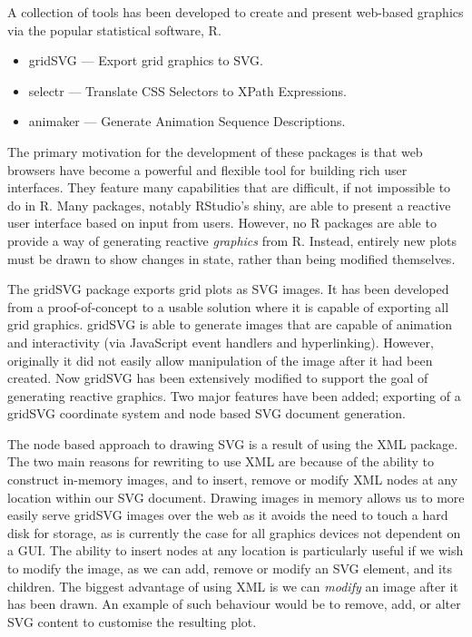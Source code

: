 \documentclass[11pt, a4paper]{article}
\title{\doctitle{}}
\author{\docauthor{} \\ \url{simon.potter@auckland.ac.nz}}
\date{\docdate{}}
\newcommand{\grid}{\textsf{grid}}
\newcommand{\R}{\textsf{R}}
\newcommand{\gridSVG}{\textsf{gridSVG}}
\newcommand{\JS}{\textsf{JavaScript}}
\newcommand{\pkg}[1]{\textsf{#1}}
\newcommand{\tsc}[1]{{\small \textsc{#1}}}
\begin{document}
\maketitle

A collection of tools has been developed to create and present
web-based graphics via the popular statistical software, \R{}.

\begin{itemize}
  \item \gridSVG{} --- Export \grid{} graphics to \tsc{SVG}.
  \item \pkg{selectr} --- Translate CSS Selectors to XPath Expressions.
  \item \pkg{animaker} --- Generate Animation Sequence Descriptions.
\end{itemize}

The primary motivation for the development of these packages is that
web browsers have become a powerful and flexible tool for building
rich user interfaces. They feature many capabilities that are
difficult, if not impossible to do in \R{}. Many packages, notably
RStudio's \pkg{shiny}, are able to present a reactive user interface
based on input from users. However, no \R{} packages are able to
provide a way of generating reactive \emph{graphics} from
\R{}. Instead, entirely new plots must be drawn to show changes in
state, rather than being modified themselves.

The \gridSVG{} package exports \pkg{grid} plots as \tsc{SVG}
images. It has been developed from a proof-of-concept to a usable
solution where it is capable of exporting all \grid{}
graphics. \gridSVG{} is able to generate images that are capable of
animation and interactivity (via \JS{} event handlers and
hyperlinking). However, originally it did not easily allow
manipulation of the image after it had been created. Now \pkg{gridSVG}
has been extensively modified to support the goal of generating
reactive graphics. Two major features have been added; exporting of a
\gridSVG{} coordinate system and node based \tsc{SVG} document
generation.

The node based approach to drawing \tsc{SVG} is a result of using the
\pkg{XML} package. The two main reasons for rewriting to use \pkg{XML}
are because of the ability to construct in-memory images, and to
insert, remove or modify \tsc{XML} nodes at any location within our
\tsc{SVG} document. Drawing images in memory allows us to more easily
serve \gridSVG{} images over the web as it avoids the need to touch a
hard disk for storage, as is currently the case for all graphics
devices not dependent on a GUI. The ability to insert nodes at any
location is particularly useful if we wish to modify the image, as we
can add, remove or modify an \tsc{SVG} element, and its children. The
biggest advantage of using \pkg{XML} is we can \emph{modify} an image
after it has been drawn. An example of such behaviour would be to
remove, add, or alter \tsc{SVG} content to customise the resulting
plot.
\end{document}
